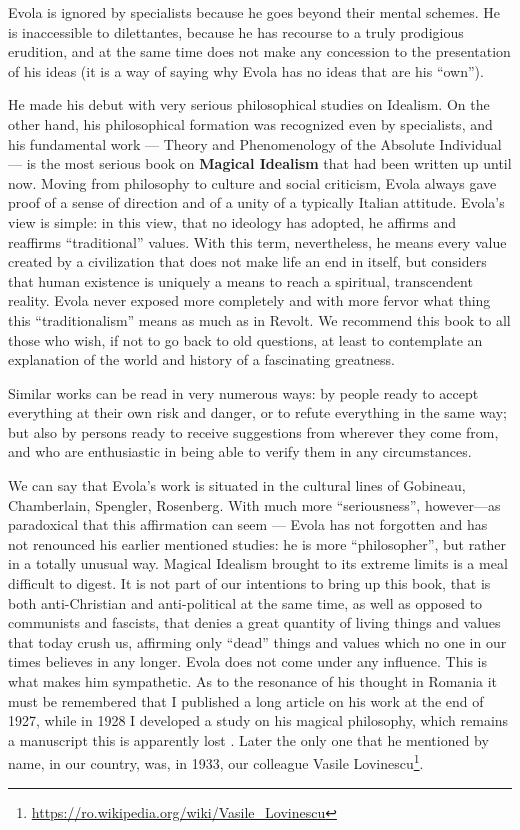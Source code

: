 Evola is ignored by specialists because he goes beyond their mental schemes. He is inaccessible to dilettantes, because he has recourse to a truly prodigious erudition, and at the same time does not make any concession to the presentation of his ideas (it is a way of saying why Evola has no ideas that are his ``own'').

He made his debut with very serious philosophical studies on Idealism. On the other hand, his philosophical formation was recognized even by specialists, and his fundamental work --- Theory and Phenomenology of the Absolute Individual --- is the most serious book on \textbf{Magical Idealism} that had been written up until now. Moving from philosophy to culture and social criticism, Evola always gave proof of a sense of direction and of a unity of a typically Italian attitude. Evola's view is simple: in this view, that no ideology has adopted, he affirms and reaffirms ``traditional'' values. With this term, nevertheless, he means every value created by a civilization that does not make life an end in itself, but considers that human existence is uniquely a means to reach a spiritual, transcendent reality. Evola never exposed more completely and with more fervor what thing this ``traditionalism'' means as much as in Revolt. We recommend this book to all those who wish, if not to go back to old questions, at least to contemplate an explanation of the world and history of a fascinating greatness.

Similar works can be read in very numerous ways: by people ready to accept everything at their own risk and danger, or to refute everything in the same way; but also by persons ready to receive suggestions from wherever they come from, and who are enthusiastic in being able to verify them in any circumstances.

We can say that Evola's work is situated in the cultural lines of Gobineau, Chamberlain, Spengler, Rosenberg. With much more ``seriousness'', however---as paradoxical that this affirmation can seem --- Evola has not forgotten and has not renounced his earlier mentioned studies: he is more ``philosopher'', but rather in a totally unusual way. Magical Idealism brought to its extreme limits is a meal difficult to digest. It is not part of our intentions to bring up this book, that is both anti-Christian and anti-political at the same time, as well as opposed to communists and fascists, that denies a great quantity of living things and values that today crush us, affirming only ``dead'' things and values which no one in our times believes in any longer. Evola does not come under any influence. This is what makes him sympathetic. As to the resonance of his thought in Romania it must be remembered that I published a long article on his work at the end of 1927, while in 1928 I developed a study on his magical philosophy, which remains a manuscript this is apparently lost . Later the only one that he mentioned by name, in our country, was, in 1933, our colleague Vasile Lovinescu\footnote{\url{https://ro.wikipedia.org/wiki/Vasile\_Lovinescu}}.


